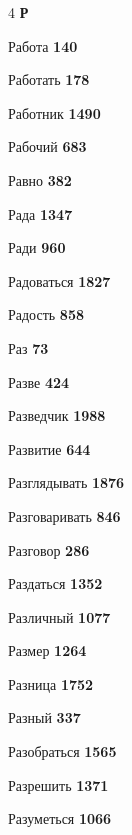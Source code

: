 \begin{multicols}{4}
\vspace{0.6em}\noindent\textbf{\normalsize\sffamily\color{primary} Р}\par\vspace{0.2em}
\noindent Работа \dotfill \textbf{\color{secondary} 140}\par
\noindent Работать \dotfill \textbf{\color{secondary} 178}\par
\noindent Работник \dotfill \textbf{\color{secondary} 1490}\par
\noindent Рабочий \dotfill \textbf{\color{secondary} 683}\par
\noindent Равно \dotfill \textbf{\color{secondary} 382}\par
\noindent Рада \dotfill \textbf{\color{secondary} 1347}\par
\noindent Ради \dotfill \textbf{\color{secondary} 960}\par
\noindent Радоваться \dotfill \textbf{\color{secondary} 1827}\par
\noindent Радость \dotfill \textbf{\color{secondary} 858}\par
\noindent Раз \dotfill \textbf{\color{secondary} 73}\par
\noindent Разве \dotfill \textbf{\color{secondary} 424}\par
\noindent Разведчик \dotfill \textbf{\color{secondary} 1988}\par
\noindent Развитие \dotfill \textbf{\color{secondary} 644}\par
\noindent Разглядывать \dotfill \textbf{\color{secondary} 1876}\par
\noindent Разговаривать \dotfill \textbf{\color{secondary} 846}\par
\noindent Разговор \dotfill \textbf{\color{secondary} 286}\par
\noindent Раздаться \dotfill \textbf{\color{secondary} 1352}\par
\noindent Различный \dotfill \textbf{\color{secondary} 1077}\par
\noindent Размер \dotfill \textbf{\color{secondary} 1264}\par
\noindent Разница \dotfill \textbf{\color{secondary} 1752}\par
\noindent Разный \dotfill \textbf{\color{secondary} 337}\par
\noindent Разобраться \dotfill \textbf{\color{secondary} 1565}\par
\noindent Разрешить \dotfill \textbf{\color{secondary} 1371}\par
\noindent Разуметься \dotfill \textbf{\color{secondary} 1066}\par

\end{multicols}
